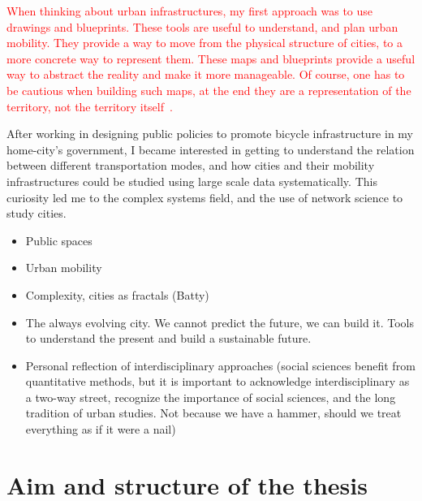\textcolor{red}{When thinking about urban infrastructures, my first approach was to use drawings and blueprints. These tools are useful to understand, and plan urban mobility. They provide a way to move from the physical structure of cities, to a more concrete way to represent them. These maps and blueprints provide a useful way to abstract the reality and make it more manageable. Of course, one has to be cautious when building such maps, at the end they are a representation of the territory, not the territory itself~\cite{borges1961hacedor}.}

After working in designing public policies to promote bicycle infrastructure in my home-city's government, I became interested in getting to understand the relation between different transportation modes, and how cities and their mobility infrastructures could be studied using large scale data systematically. This curiosity led me to the complex systems field, and the use of network science to study cities.

\begin{itemize}
    \item Public spaces
    \item Urban mobility
    \item Complexity, cities as fractals (Batty)
    \item The always evolving city. We cannot predict the future, we can build it. Tools to understand the present and build a sustainable future.
    \item Personal reflection of interdisciplinary approaches (social sciences benefit from quantitative methods, but it is important to acknowledge interdisciplinary as a two-way street, recognize the importance of social sciences, and the long tradition of urban studies. Not because we have a hammer, should we treat everything as if it were a nail) 
\end{itemize}


\section{Aim and structure of the thesis}

